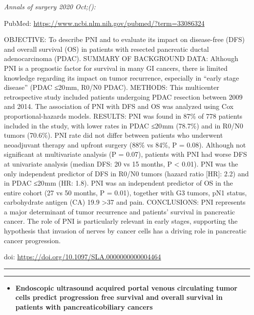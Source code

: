 \documentclass[
]{article}
\providecommand{\tightlist}{%
  \setlength{\itemsep}{0pt}\setlength{\parskip}{0pt}}
\begin{document}
\emph{Annals of surgery 2020 Oct;():}

PubMed: \url{https://www.ncbi.nlm.nih.gov/pubmed/?term=33086324}

OBJECTIVE: To describe PNI and to evaluate its impact on disease-free
(DFS) and overall survival (OS) in patients with resected pancreatic
ductal adenocarcinoma (PDAC). SUMMARY OF BACKGROUND DATA: Although PNI
is a prognostic factor for survival in many GI cancers, there is limited
knowledge regarding its impact on tumor recurrence, especially in
``early stage disease'' (PDAC ≤20 mm, R0/N0 PDAC). METHODS: This
multicenter retrospective study included patients undergoing PDAC
resection between 2009 and 2014. The association of PNI with DFS and OS
was analyzed using Cox proportional-hazards models. RESULTS: PNI was
found in 87\% of 778 patients included in the study, with lower rates in
PDAC ≤20 mm (78.7\%) and in R0/N0 tumors (70.6\%). PNI rate did not
differ between patients who underwent neoadjuvant therapy and upfront
surgery (88\% vs 84\%, P = 0.08). Although not significant at
multivariate analysis (P = 0.07), patients with PNI had worse DFS at
univariate analysis (median DFS: 20 vs 15 months, P \textless{} 0.01).
PNI was the only independent predictor of DFS in R0/N0 tumors (hazard
ratio {[}HR{]}: 2.2) and in PDAC ≤20 mm (HR: 1.8). PNI was an
independent predictor of OS in the entire cohort (27 vs 50 months, P =
0.01), together with G3 tumors, pN1 status, carbohydrate antigen (CA)
19.9 \textgreater37 and pain. CONCLUSIONS: PNI represents a major
determinant of tumor recurrence and patients' survival in pancreatic
cancer. The role of PNI is particularly relevant in early stages,
supporting the hypothesis that invasion of nerves by cancer cells has a
driving role in pancreatic cancer progression.

doi: \url{https://doi.org/10.1097/SLA.0000000000004464}

\begin{center}\rule{0.5\linewidth}{0.5pt}\end{center}

\begin{center}\rule{0.5\linewidth}{0.5pt}\end{center}

\begin{itemize}
\tightlist
\item
  \textbf{Endoscopic ultrasound acquired portal venous circulating tumor
  cells predict progression free survival and overall survival in
  patients with pancreaticobiliary cancers}
\end{itemize}
\end{document}
